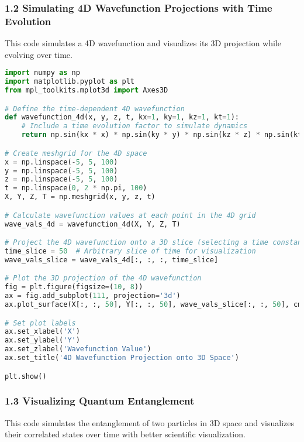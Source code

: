 \documentclass[12pt]{article}
\begin{document}
\subsubsection*{1.2 Simulating 4D Wavefunction Projections with Time Evolution}

This code simulates a 4D wavefunction and visualizes its 3D projection while evolving over time.

\begin{lstlisting}[language=Python, caption={Python Code: Simulating 4D Wavefunction Projections with Time Evolution}]
import numpy as np
import matplotlib.pyplot as plt
from mpl_toolkits.mplot3d import Axes3D

# Define the time-dependent 4D wavefunction
def wavefunction_4d(x, y, z, t, kx=1, ky=1, kz=1, kt=1):
    # Include a time evolution factor to simulate dynamics
    return np.sin(kx * x) * np.sin(ky * y) * np.sin(kz * z) * np.sin(kt * t)

# Create meshgrid for the 4D space
x = np.linspace(-5, 5, 100)
y = np.linspace(-5, 5, 100)
z = np.linspace(-5, 5, 100)
t = np.linspace(0, 2 * np.pi, 100)
X, Y, Z, T = np.meshgrid(x, y, z, t)

# Calculate wavefunction values at each point in the 4D grid
wave_vals_4d = wavefunction_4d(X, Y, Z, T)

# Project the 4D wavefunction onto a 3D slice (selecting a time constant slice)
time_slice = 50  # Arbitrary slice of time for visualization
wave_vals_slice = wave_vals_4d[:, :, :, time_slice]

# Plot the 3D projection of the 4D wavefunction
fig = plt.figure(figsize=(10, 8))
ax = fig.add_subplot(111, projection='3d')
ax.plot_surface(X[:, :, 50], Y[:, :, 50], wave_vals_slice[:, :, 50], cmap='plasma')

# Set plot labels
ax.set_xlabel('X')
ax.set_ylabel('Y')
ax.set_zlabel('Wavefunction Value')
ax.set_title('4D Wavefunction Projection onto 3D Space')

plt.show()
\end{lstlisting}

\subsubsection*{1.3 Visualizing Quantum Entanglement}

This code simulates the entanglement of two particles in 3D space and visualizes their correlated states over time with better scientific visualization.
\end{document}
